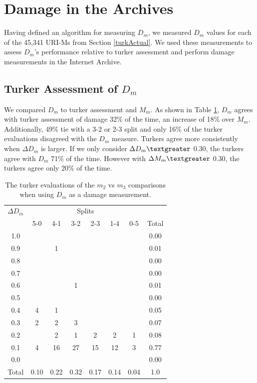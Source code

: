 \section{Damage in the Archives}
\label{eval} 

Having defined an algorithm for measuring $D_m$, we measured $D_m$ values for each of the 45,341 URI-Ms from Section \ref{turkActual}. We used these measurements to assess $D_m$'s performance relative to turker assessment and perform damage measurements in the Internet Archive.

\subsection{Turker Assessment of $D_m$}
\label{turkerDm}


We compared $D_m$ to turker assessment and $M_m$. As shown in Table \ref{m2table}, $D_m$ agrees with turker assessment of damage 32\% of the time, an increase of 18\% over $M_m$. Additionally, 49\% tie with a 3-2 or 2-3 split and only 16\% of the turker evaluations disagreed with the $D_m$ measure. Turkers agree more consistently when {$\Delta D_m$} is larger. If we only consider {$\Delta D_m \textgreater$} 0.30, the turkers agree with $D_m$ 71\% of the time. However with {$\Delta M_m \textgreater$} 0.30, the turkers agree only 20\% of the time. 


\begin{table}
\begin{tabular}{ c | c | c | c | c | c | c || c}
    {$\Delta D_m$} &  \multicolumn{6}{c}{Splits}\\
  & 5-0 & 4-1 & 3-2 & 2-3 & 1-4 & 0-5 & Total\\
\hline
1.0 &  &  &  &  &  & & 0.00\\
0.9 &  & 1 &  &  &  & & 0.01\\
0.8 &  &  &  &  &  & & 0.00\\
0.7 &  &  &  &  &  & & 0.00\\
0.6 &  &  & 1 &  &  & & 0.01\\
0.5 &  &  &  &  &  & & 0.00\\
0.4 & 4 & 1 &  &  &  & & 0.05\\
0.3 & 2 & 2 & 3 &  &  & & 0.07\\
0.2 &  & 2 & 1 & 2 & 2 & 1& 0.08\\
0.1 & 4 & 16 & 27 & 15 & 12 & 3& 0.77\\
0.0 &  &  &  &  &  & & 0.00\\
\hline
Total & 0.10 & 0.22 & 0.32 & 0.17 & 0.14 & 0.04 & 1.0
\end{tabular}
  \caption{The turker evaluations of the $m_2$ vs $m_3$ comparisons when using $D_m$ as a damage measurement.}
  \label{m2table}
\end{table}



